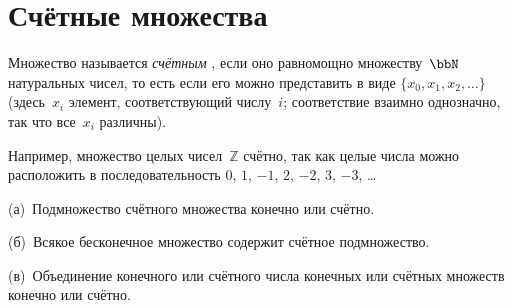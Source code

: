 \section{Счётные множества}
        \label{countable-sets}

Множество называется \emph{счётным}%
, если оно равномощно
множеству~$\bbN$\index{$\bbN$} натуральных чисел,
то есть если его можно
представить в виде $\{x_0,x_1,x_2,\dots\}$ (здесь~$x_i$\т
элемент, соответствующий числу~$i$; соответствие взаимно
однозначно, так что все~$x_i$ различны).

Например, множество целых чисел~$\mathbb{Z}$ счётно, так как
целые числа можно расположить в последовательность $0$, $1$,
$-1$, $2$, $-2$, $3$, $-3$, \ldots

\begin{theorem}
        \label{countable-sets-properties}
(\textsf{а})~Подмножество счётного множества конечно или счётно.

(\textsf{б})~Всякое бесконечное множество содержит счётное
        подмножество.

(\textsf{в})~Объединение конечного или счётного числа конечных
        или счётных множеств конечно или счётно.
\end{theorem}

